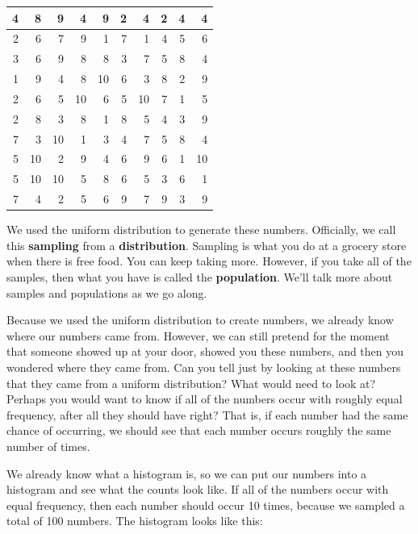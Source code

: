 \documentclass[
]{book}
\begin{document}
\begin{tabular}{r|r|r|r|r|r|r|r|r|r}
\hline
4 & 8 & 9 & 4 & 9 & 2 & 4 & 2 & 4 & 4\\
\hline
2 & 6 & 7 & 9 & 1 & 7 & 1 & 4 & 5 & 6\\
\hline
3 & 6 & 9 & 8 & 8 & 3 & 7 & 5 & 8 & 4\\
\hline
1 & 9 & 4 & 8 & 10 & 6 & 3 & 8 & 2 & 9\\
\hline
2 & 6 & 5 & 10 & 6 & 5 & 10 & 7 & 1 & 5\\
\hline
2 & 8 & 3 & 8 & 1 & 8 & 5 & 4 & 3 & 9\\
\hline
7 & 3 & 10 & 1 & 3 & 4 & 7 & 5 & 8 & 4\\
\hline
5 & 10 & 2 & 9 & 4 & 6 & 9 & 6 & 1 & 10\\
\hline
5 & 10 & 10 & 5 & 8 & 6 & 5 & 3 & 6 & 1\\
\hline
7 & 4 & 2 & 5 & 6 & 9 & 7 & 9 & 3 & 9\\
\hline
\end{tabular}

We used the uniform distribution to generate these numbers. Officially, we call this \textbf{sampling} from a \textbf{distribution}. Sampling is what you do at a grocery store when there is free food. You can keep taking more. However, if you take all of the samples, then what you have is called the \textbf{population}. We'll talk more about samples and populations as we go along.

Because we used the uniform distribution to create numbers, we already know where our numbers came from. However, we can still pretend for the moment that someone showed up at your door, showed you these numbers, and then you wondered where they came from. Can you tell just by looking at these numbers that they came from a uniform distribution? What would need to look at? Perhaps you would want to know if all of the numbers occur with roughly equal frequency, after all they should have right? That is, if each number had the same chance of occurring, we should see that each number occurs roughly the same number of times.

We already know what a histogram is, so we can put our numbers into a histogram and see what the counts look like. If all of the numbers occur with equal frequency, then each number should occur 10 times, because we sampled a total of 100 numbers. The histogram looks like this:
\end{document}
